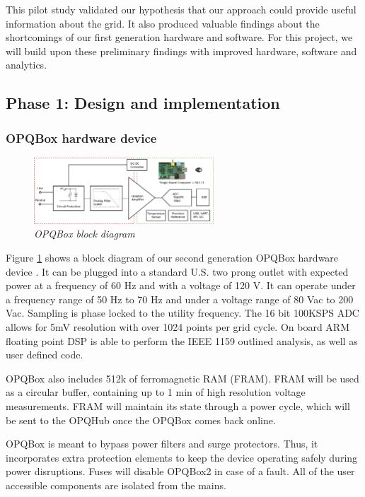 This pilot study validated our hypothesis that our approach could provide useful information about the grid. It also produced valuable findings about the shortcomings of our first generation hardware and software.  For this project, we will build upon these preliminary findings with improved hardware, software and analytics. 

\subsection{Phase 1: Design and implementation}

\subsubsection{OPQBox hardware device}

\begin{figure}
  \includegraphics[width=0.6\textwidth]{figures/opq2.eps}
  \caption{\em \small OPQBox block diagram}
  \label{fig:hardware-block-diagram}
\end{figure} 

Figure \ref{fig:hardware-block-diagram} shows a block diagram of our second generation OPQBox hardware device \cite{opqbox2}. It can be plugged into a standard U.S. two prong outlet with expected power at a frequency of 60 Hz and with a voltage of 120 V. It can operate under a frequency range of 50 Hz to 70 Hz and under a voltage range of 80 Vac to 200 Vac. Sampling is phase locked to the utility frequency. The 16 bit 100KSPS ADC allows for 5mV resolution with over 1024 points per grid cycle. On board ARM floating point DSP is able to perform the IEEE 1159 outlined analysis, as well as user defined code. 

OPQBox also includes 512k of ferromagnetic RAM (FRAM). FRAM will be used as a circular buffer, containing up to 1 min of high resolution voltage measurements. FRAM will maintain its state through a power cycle, which will be sent to the OPQHub once the OPQBox comes back online.

OPQBox is meant to bypass power filters and surge protectors. Thus, it incorporates extra protection elements to keep the device operating safely during power disruptions. Fuses will disable OPQBox2 in case of a fault. All of the user accessible components are isolated from the mains.

